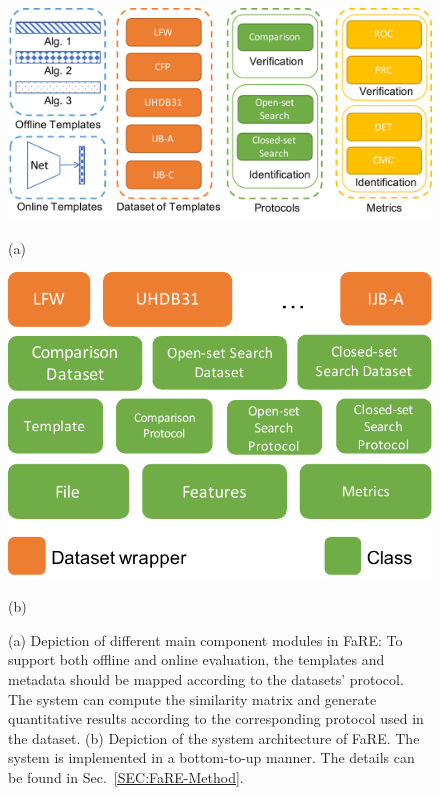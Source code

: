 \documentclass{article}
\begin{document}
\begin{figure}[htb]
\begin{minipage}[b]{.58\linewidth}
  \centering
  \centerline{\includegraphics[width=\linewidth]{FaRE-Comp}}
  \centerline{(a)}\medskip
\end{minipage}
\hfill
\begin{minipage}[b]{0.39\linewidth}
  \centering
  \centerline{\includegraphics[width=\linewidth]{FaRE-Arch}}
  \centerline{(b)}\medskip
\end{minipage}
\vspace{-1em}
\caption{(a) Depiction of different main component modules in FaRE: To support both offline and online evaluation, the templates and metadata should be mapped according to the datasets' protocol. The system can compute the similarity matrix and generate quantitative results according to the corresponding protocol used in the dataset. (b) Depiction of the system architecture of FaRE. The system is implemented in a bottom-to-up manner. The details can be found in Sec.~\ref{SEC:FaRE-Method}.}
\label{FIG:FaRE-Arch}
\end{figure}
\end{document}
